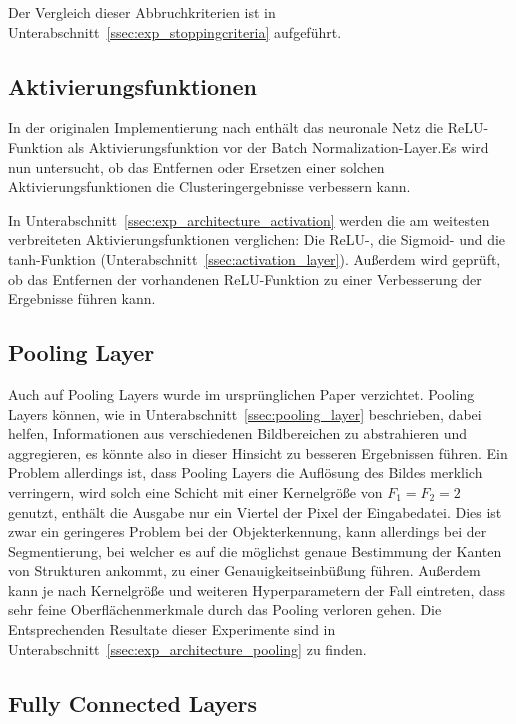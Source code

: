 Der Vergleich dieser Abbruchkriterien ist in Unterabschnitt~\ref{ssec:exp_stoppingcriteria} aufgeführt.

\subsection{Aktivierungsfunktionen}
\label{ssec:network_architecture_activation}

In der originalen Implementierung nach \cite{kanezaki_18} enthält das neuronale Netz die ReLU-Funktion als Aktivierungsfunktion vor der Batch Normalization-Layer.Es wird nun untersucht, ob das Entfernen oder Ersetzen einer solchen Aktivierungsfunktionen die Clusteringergebnisse verbessern kann.

In Unterabschnitt~\ref{ssec:exp_architecture_activation} werden die am weitesten verbreiteten Aktivierungsfunktionen verglichen: Die ReLU-, die Sigmoid- und die tanh-Funktion (\vgl Unterabschnitt~\ref{ssec:activation_layer}). Außerdem wird geprüft, ob das Entfernen der vorhandenen ReLU-Funktion zu einer Verbesserung der Ergebnisse führen kann.

\subsection{Pooling Layer}
\label{ssec:network_architecture_pooling}

Auch auf Pooling Layers wurde im ursprünglichen Paper verzichtet. Pooling Layers können, wie in Unterabschnitt~\ref{ssec:pooling_layer} beschrieben, dabei helfen, Informationen aus verschiedenen Bildbereichen zu abstrahieren und aggregieren, es könnte also in dieser Hinsicht zu besseren Ergebnissen führen. Ein Problem allerdings ist, dass Pooling Layers die Auflösung des Bildes merklich verringern, wird solch eine Schicht \bspw mit einer Kernelgröße von $F_1=F_2=2$ genutzt, enthält die Ausgabe nur ein Viertel der Pixel der Eingabedatei. Dies ist zwar ein geringeres Problem bei der Objekterkennung, kann allerdings bei der Segmentierung, bei welcher es auf die möglichst genaue Bestimmung der Kanten von Strukturen ankommt, zu einer Genauigkeitseinbüßung führen. Außerdem kann je nach Kernelgröße und weiteren Hyperparametern der Fall eintreten, dass sehr feine Oberflächenmerkmale durch das Pooling verloren gehen. Die Entsprechenden Resultate dieser Experimente sind in Unterabschnitt~\ref{ssec:exp_architecture_pooling} zu finden.

\subsection{Fully Connected Layers}
\label{ssec:network_architecture_fully_connected}

